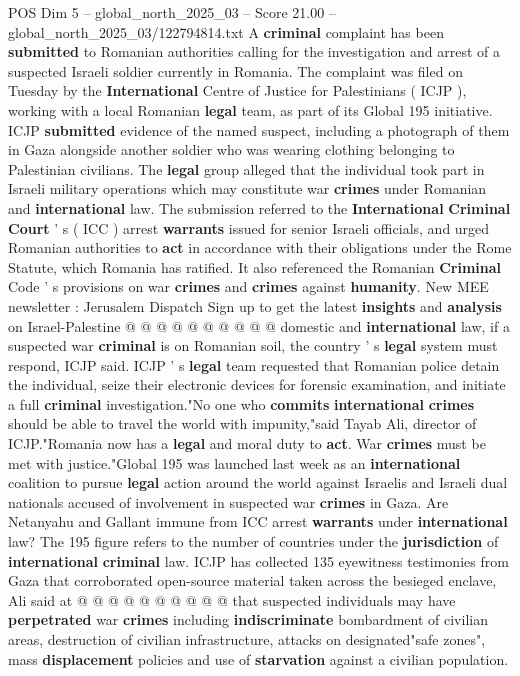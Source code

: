 \begin{textsample}{POS Dim 5 – global\_north\_2025\_03 – Score 21.00 – global\_north\_2025\_03/122794814.txt}  \label{ex:f5_pos_152}
A \textbf{criminal} complaint has been \textbf{submitted} to Romanian authorities calling for the investigation and arrest of a suspected Israeli soldier currently in Romania.
The complaint was filed on Tuesday by the \textbf{International} Centre of Justice for Palestinians ( ICJP ), working with a local Romanian \textbf{legal} team, as part of its Global 195 initiative.
ICJP \textbf{submitted} evidence of the named suspect, including a photograph of them in Gaza alongside another soldier who was wearing clothing belonging to Palestinian civilians.
The \textbf{legal} group alleged that the individual took part in Israeli military operations which may constitute war \textbf{crimes} under Romanian and \textbf{international} law.
The submission referred to the \textbf{International} \textbf{Criminal} \textbf{Court} ' s ( ICC ) arrest \textbf{warrants} issued for senior Israeli officials, and urged Romanian authorities to \textbf{act} in accordance with their obligations under the Rome Statute, which Romania has ratified.
It also referenced the Romanian \textbf{Criminal} Code ' s provisions on war \textbf{crimes} and \textbf{crimes} against \textbf{humanity}.
New MEE newsletter : Jerusalem Dispatch Sign up to get the latest \textbf{insights} and \textbf{analysis} on Israel-Palestine @ @ @ @ @ @ @ @ @ @ domestic and \textbf{international} law, if a suspected war \textbf{criminal} is on Romanian soil, the country ' s \textbf{legal} system must respond, ICJP said.
ICJP ' s \textbf{legal} team requested that Romanian police detain the individual, seize their electronic devices for forensic examination, and initiate a full \textbf{criminal} investigation."No one who \textbf{commits} \textbf{international} \textbf{crimes} should be able to travel the world with impunity,"said Tayab Ali, director of ICJP."Romania now has a \textbf{legal} and moral duty to \textbf{act}.
War \textbf{crimes} must be met with justice."Global 195 was launched last week as an \textbf{international} coalition to pursue \textbf{legal} action around the world against Israelis and Israeli dual nationals accused of involvement in suspected war \textbf{crimes} in Gaza.
Are Netanyahu and Gallant immune from ICC arrest \textbf{warrants} under \textbf{international} law?
The 195 figure refers to the number of countries under the \textbf{jurisdiction} of \textbf{international} \textbf{criminal} law.
ICJP has collected 135 eyewitness testimonies from Gaza that corroborated open-source material taken across the besieged enclave, Ali said at @ @ @ @ @ @ @ @ @ @ that suspected individuals may have \textbf{perpetrated} war \textbf{crimes} including \textbf{indiscriminate} bombardment of civilian areas, destruction of civilian infrastructure, attacks on designated"safe zones", mass \textbf{displacement} policies and use of \textbf{starvation} against a civilian population.

\end{textsample}
